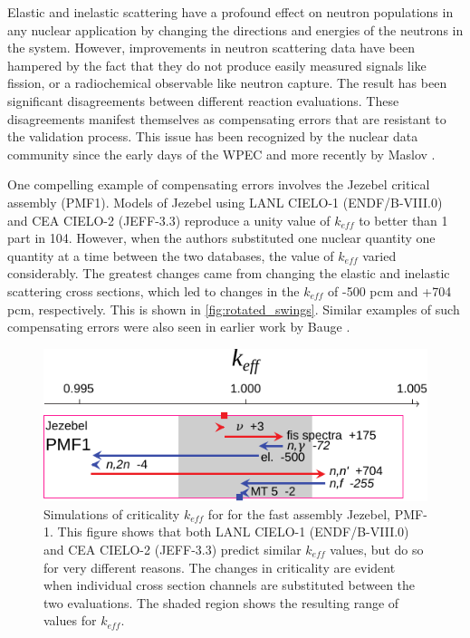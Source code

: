 \documentclass[letterpaper]{ar-1col}
\begin{document}
Elastic and inelastic scattering have a profound effect on neutron populations in any nuclear application by changing the directions and energies of the neutrons in the system.  However, improvements in neutron scattering data have been hampered by the fact that they do not produce easily measured signals like fission, or a radiochemical observable like neutron capture.  The result has been significant disagreements between different reaction evaluations.  These disagreements manifest themselves as compensating errors that are resistant to the validation process.  This issue has been recognized by the nuclear data community since the early days of the WPEC \cite{Row89} and more recently by Maslov \cite{Mas11}.  

One compelling example of compensating errors involves the Jezebel  critical assembly (PMF1).  Models of Jezebel using LANL CIELO-1 (ENDF/B-VIII.0) and CEA CIELO-2 (JEFF-3.3) reproduce a unity value of $k_{eff}$ to better than 1 part in 104.  However, when the authors substituted one nuclear quantity one quantity at a time between the two databases, the value of $k_{eff}$ varied considerably.  The greatest changes came from changing the elastic and inelastic scattering cross sections, which led to changes in the $k_{eff}$ of -500 pcm and +704 pcm, respectively. This is shown in \autoref{fig:rotated_swings}.   Similar examples of such compensating errors were also seen in earlier work by Bauge \cite{Bau12}.  

\begin{figure}
 \centering
 \includegraphics[width=0.8\linewidth]{rotated_swings.pdf}

 \caption{Simulations of criticality $k_{eff}$ for  for the fast assembly Jezebel, PMF-1. This figure shows that both LANL CIELO-1 (ENDF/B-VIII.0) and CEA CIELO-2 (JEFF-3.3) predict similar $k_{eff}$ values, but do so for very different reasons. The changes in criticality are evident when individual cross section channels are substituted between the two evaluations.  The shaded region shows the  resulting range of values for $k_{eff}$.}
 \label{fig:rotated_swings}
\end{figure}
\end{document}
